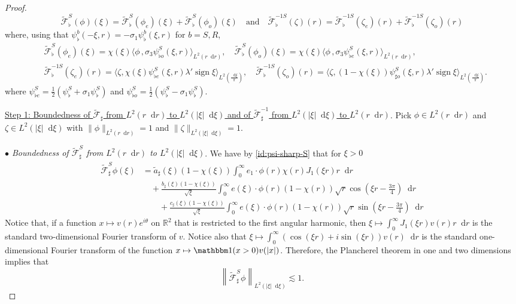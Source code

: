 \documentclass[11 pt]{amsart}
\theoremstyle{definition}
\theoremstyle{remark}
\numberwithin{equation}{section}
\newcommand{\dd}{\mathop{}\!\mathrm{d}}
\begin{document}
\begin{proof}
$$
\widetilde{\mathcal{F}}_\flat^S (\phi)(\xi) =\widetilde{\mathcal{F}}_\flat^S (\phi_e)(\xi) +\widetilde{\mathcal{F}}_\flat^S (\phi_o)(\xi) \quad \mbox{and}\quad \widetilde{\mathcal{F}}_\flat^{-1S} (\zeta)(r) =\widetilde{\mathcal{F}}_\flat^{-1S} (\zeta_e)(r) +\widetilde{\mathcal{F}}_\flat^{-1S} (\zeta_o)(r)
$$
where, using that $\psi_{\flat}^b (-\xi,r)=-\sigma_1 \psi_{\flat}^b (\xi,r)$ for $b=S,R$,
\begin{align*}
& \widetilde{\mathcal{F}}_\flat^S (\phi_e)(\xi) =  \chi(\xi)\langle \phi \,, \sigma_3 \psi_{\flat o}^S (\xi,r) \rangle_{L^2(r\dd r)}, \quad \widetilde{\mathcal{F}}_\flat^S (\phi_o)(\xi) =  \chi(\xi)\langle \phi \,, \sigma_3 \psi_{\flat e}^S (\xi,r) \rangle_{L^2(r\dd r)}, \\
& \widetilde{\mathcal{F}}^{-1S}_\flat (\zeta_e)(r) =  \langle \zeta , \chi(\xi)\psi_{\flat e}^S(\xi,r) \lambda' \operatorname{sign} \xi \rangle_{L^2(\frac{\dd \xi}{\pi})}, \quad \widetilde{\mathcal{F}}^{-1S}_\flat (\zeta_o)(r) = \langle \zeta , (1-\chi(\xi))\psi_{\sharp o}^S(\xi,r) \lambda' \operatorname{sign} \xi  \rangle_{L^2(\frac{\dd \xi}{\pi})}.
\end{align*}
where $ \psi_{\flat e}^S =\frac 12 (\psi_{\flat }^S+\sigma_1 \psi_{\flat }^S)$ and $ \psi_{\flat o}^S =\frac 12 (\psi_{\flat}^S-\sigma_1 \psi_{\flat }^S)$.

\medskip

\noindent \underline{Step 1: Boundedness of $\widetilde{\mathcal F}_\sharp$ from $L^2(r\dd r)$ to $L^2(|\xi|\dd \xi)$ and of $\widetilde{\mathcal F}^{-1}_\sharp$ from $L^2(|\xi|\dd \xi)$ to $L^2(r\dd r)$}. Pick $\phi \in L^2(r\dd r)$ and $\zeta\in L^2(|\xi|\dd \xi)$ with $\| \phi\|_{L^2(r\dd r)}=1$ and $\| \zeta \|_{L^2(|\xi|\dd \xi)}=1$.

\medskip

\noindent \textit{$\bullet$ Boundedness of $\widetilde{\mathcal F}_\sharp^S$ from $L^2(r\dd r)$ to $L^2(|\xi|\dd \xi)$}. We have by \eqref{id:psi-sharp-S} that for $\xi>0$
\begin{align}
\label{formula-direct-fourier-sharp-S} \widetilde{\mathcal{F}}_\sharp^S \phi(\xi) & =\widetilde a_\sharp (\xi) (1- \chi(\xi)) \int_0^\infty e_1 \cdot \phi(r)\chi (r)  J_1(\xi r) r\dd r \\
\nonumber & \quad+\frac{b_\sharp(\xi)(1-\chi(\xi))}{\sqrt{\xi}} \int_0^\infty e(\xi) \cdot \phi(r)(1-\chi (r))\sqrt{r}  \cos(\xi r-\frac{3\pi}{4})\dd r \\
\nonumber &\qquad +\frac{c_\sharp(\xi)(1-\chi(\xi))}{\sqrt{\xi}} \int_0^\infty e(\xi) \cdot \phi(r)(1-\chi (r))\sqrt{r}  \sin(\xi r-\frac{3\pi}{4})\dd r 
\end{align}
Notice that, if a function $x\mapsto v(r)e^{i\theta}$ on $\mathbb R^2$ that is restricted to the first angular harmonic, then $\xi \mapsto \int_0^\infty J_1(\xi r ) v(r)r \dd r$ is the standard two-dimensional Fourier transform of $v$. Notice also that $\xi \mapsto \int_0^\infty (\cos (\xi r)+i\sin (\xi r)) v(r)\dd r$ is the standard one-dimensional Fourier transform of the function $x\mapsto \mathbbm 1(x>0) v(|x|)$. Therefore, the Plancherel theorem in one and two dimensions implies that
$$
\left\| \widetilde{\mathcal{F}}_\sharp^S \phi   \right\|_{L^2(|\xi| \dd \xi)} \lesssim 1.
$$


\end{proof}
\end{document}
